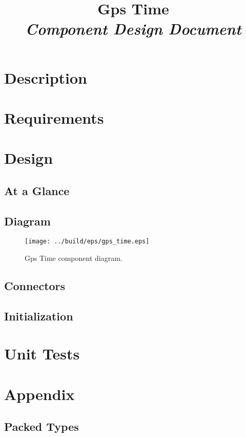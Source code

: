 



\title{\textbf{Gps Time} \\
\large\textit{Component Design Document}}
\date{}
\maketitle

\section{Description}


\section{Requirements}


\section{Design}

\subsection{At a Glance}


\subsection{Diagram}
\begin{figure}[H]
  \texttt{[image: ../build/eps/gps\_time.eps]}
  \caption{Gps Time component diagram.}
\end{figure}

\subsection{Connectors}


\subsection{Initialization}


\section{Unit Tests}



\section{Appendix}
\subsection{Packed Types}




